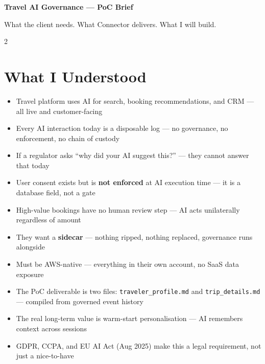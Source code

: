 \documentclass[10pt, a4paper]{article}
\begin{document}
\setlength{\parskip}{3pt}

{\centering
  {\large\bfseries\color{cblue} Travel AI Governance --- PoC Brief}\par
  \vspace{2pt}
  {\small\color{cgray} What the client needs. What Connector delivers. What I will build.}\par
}
\vspace{6pt}

\begin{multicols}{2}

\section{What I Understood}

\begin{itemize}[leftmargin=*, itemsep=1pt, topsep=2pt, label=\textcolor{cblue}{\small$\bullet$}]
  \item Travel platform uses AI for search, booking recommendations, and CRM --- all live and customer-facing
  \item Every AI interaction today is a disposable log --- no governance, no enforcement, no chain of custody
  \item If a regulator asks ``why did your AI suggest this?'' --- they cannot answer that today
  \item User consent exists but is \textbf{not enforced} at AI execution time --- it is a database field, not a gate
  \item High-value bookings have no human review step --- AI acts unilaterally regardless of amount
  \item They want a \textbf{sidecar} --- nothing ripped, nothing replaced, governance runs alongside
  \item Must be AWS-native --- everything in their own account, no SaaS data exposure
  \item The PoC deliverable is two files: \texttt{traveler\_profile.md} and \texttt{trip\_details.md} --- compiled from governed event history
  \item The real long-term value is warm-start personalisation --- AI remembers context across sessions
  \item GDPR, CCPA, and EU AI Act (Aug 2025) make this a legal requirement, not just a nice-to-have
\end{itemize}


\end{multicols}
\end{document}
